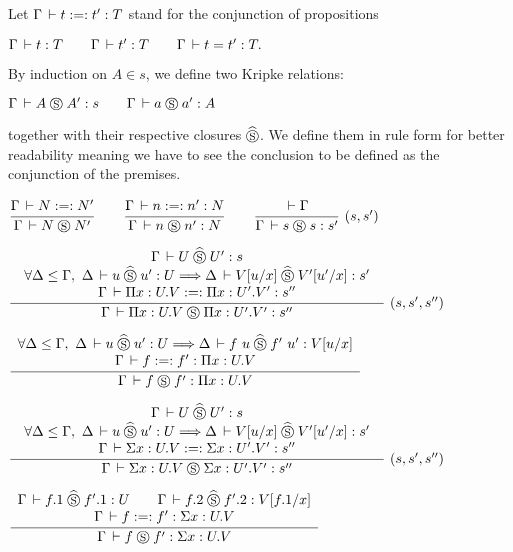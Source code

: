 \documentclass[a4paper,english]{lipics-utf8x}
\begin{document}

  Let $\Gamma \,\vdash t :=: t' : T$ stand for the conjunction of propositions
  \begin{center}
  \(
    \Gamma \,\vdash t : T
    \qquad
    \Gamma \,\vdash t' : T
    \qquad
    \Gamma \,\vdash t = t' : T.
  \)
  \end{center}
  By induction on $A \in s$, we define two Kripke relations:
  \begin{center}
  \(
    \Gamma \,\vdash A \mathrel{\circledS} A' : s
    \qquad
    \Gamma \,\vdash a \mathrel{\circledS} a' : A
  \)
  \end{center}
  together with their respective closures $\mathrel{\widehat{\mathrel{\circledS}}}$.
  We define them in rule form for better readability meaning we have to see the
  conclusion to be defined as the conjunction of the premises.

  \begin{center}
  \(
    \ru{\Gamma \der N :=: N'
      }{\Gamma \der N \Sr N'}
    \qquad
    \ru{\Gamma \der n :=: n' : N
      }{\Gamma \der n \Sr n' : N}
    \qquad
    \rux{\der \Gamma
       }{\Gamma \der s \Sr s : s'
       }{(s,s')}
  \)
  \end{center}

  \begin{center}
  \(
    \trux{\Gamma \der U \hSr U' : s
        }{\forall \Delta \le \Gamma,\ \Delta \der u \hSr u' : U \gives
          \Delta \der V[u/x] \hSr V'[u'/x] : s'
        }{\Gamma \der \Pi x:U.V :=: \Pi x:U'.V' : s''
        }{\Gamma \der \Pi x:U.V \Sr \Pi x:U'.V' : s''
        }{(s,s',s'')}
  \)
  \end{center}

  \begin{center}
  \(
    \dru{\forall \Delta \le \Gamma,\ \Delta \der u \hSr u' : U \gives
         \Delta \der f~u \hSr f'~u' : V[u/x]
       }{\Gamma \der f :=: f' : \Pi x:U.V
       }{\Gamma \der f \Sr f' : \Pi x:U.V}
  \)
  \end{center}

  \begin{center}
  \(
    \trux{\Gamma \der U \hSr U' : s
        }{\forall \Delta \le \Gamma,\ \Delta \der u \hSr u' : U \gives
          \Delta \der V[u/x] \hSr V'[u'/x] : s'
        }{\Gamma \der \Sigma x:U.V :=: \Sigma x:U'.V' : s''
        }{\Gamma \der \Sigma x:U.V \Sr \Sigma x:U'.V' : s''
        }{(s,s',s'')}
  \)
  \end{center}

  \begin{center}
  \(
    \dru{\Gamma \der f.1 \hSr f'.1 : U \qquad
         \Gamma \der f.2 \hSr f'.2 : V[f.1/x]
       }{\Gamma \der f :=: f' : \Sigma x:U.V
       }{\Gamma \der f \Sr f' : \Sigma x:U.V}
  \)
  \end{center}
\end{document}
